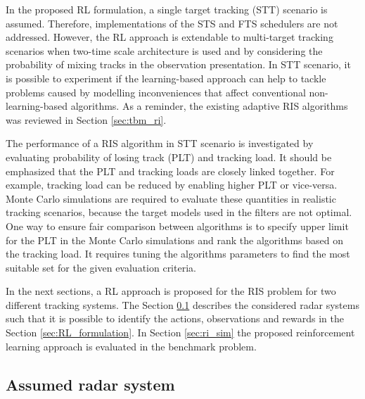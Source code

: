 \documentclass[english, 12pt, a4paper, elec, utf8, a-1b, online]{aaltothesis}
\begin{document}
In the proposed RL formulation, a single target tracking (STT) scenario is assumed. 
Therefore, implementations of the STS and FTS schedulers are not addressed.
However, the RL approach is extendable to multi-target tracking scenarios when two-time scale architecture is used and by considering the probability of mixing tracks in the observation presentation. 
In STT scenario, it is possible to experiment if the learning-based approach can help to tackle problems caused by modelling inconveniences that affect conventional non-learning-based algorithms.
As a reminder, the existing adaptive RIS algorithms was reviewed in Section \ref{sec:tbm_ri}.

The performance of a RIS algorithm in STT scenario is investigated by evaluating probability of losing track (PLT) and tracking load.
It should be emphasized that the PLT and tracking loads are closely linked together.
For example, tracking load can be reduced by enabling higher PLT or vice-versa.
Monte Carlo simulations are required to evaluate these quantities in realistic tracking scenarios, because the target models used in the filters are not optimal.
One way to ensure fair comparison between algorithms is to specify upper limit for the PLT in the Monte Carlo simulations and rank the algorithms based on the tracking load.
It requires tuning the algorithms parameters to find the most suitable set for the given evaluation criteria.

In the next sections, a RL approach is proposed for the RIS problem for two different tracking systems.
The Section \ref{sec:system_description} describes the considered radar systems
such that it is possible to identify the actions, observations and rewards in the Section \ref{sec:RL_formulation}.
In Section \ref{sec:ri_sim} the proposed reinforcement learning approach is evaluated in the benchmark problem. 


\subsection{Assumed radar system} \label{sec:system_description}
\end{document}
